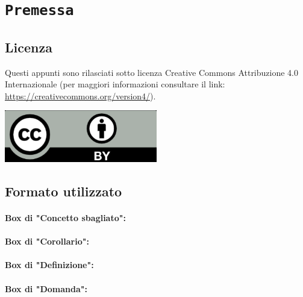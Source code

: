 \chapter*{\centering \texttt{Premessa}}

\section*{Licenza}

Questi appunti sono rilasciati sotto licenza Creative Commons Attribuzione 4.0 Internazionale (per maggiori
informazioni consultare il link: \href{https://creativecommons.org/version4/}{https://creativecommons.org/version4/}).
\begin{center}
    \includegraphics[width=0.5\textwidth]{images/cc.png}
\end{center}

\section*{Formato utilizzato}

\subsubsection{Box di "Concetto sbagliato":}


\subsubsection{Box di "Corollario":}


\subsubsection{Box di "Definizione":}


\subsubsection{Box di "Domanda":}

